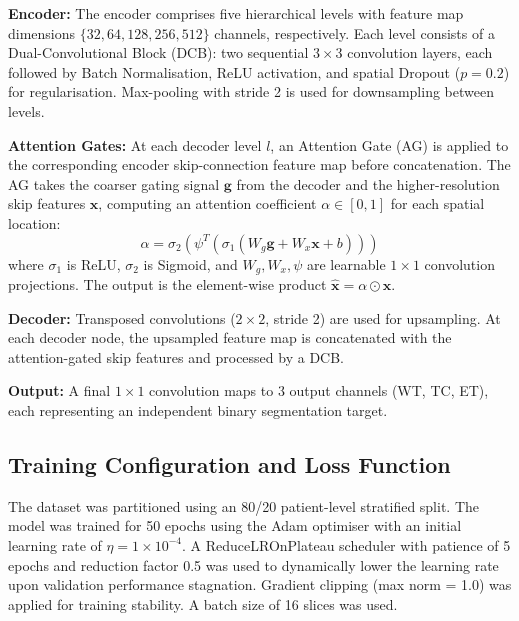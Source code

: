 \documentclass[conference]{IEEEtran}
\begin{document}
\textbf{Encoder:} The encoder comprises five hierarchical levels with feature map dimensions $\{32, 64, 128, 256, 512\}$ channels, respectively. Each level consists of a Dual-Convolutional Block (DCB): two sequential $3\times3$ convolution layers, each followed by Batch Normalisation, ReLU activation, and spatial Dropout ($p=0.2$) for regularisation. Max-pooling with stride 2 is used for downsampling between levels.

\textbf{Attention Gates:} At each decoder level $l$, an Attention Gate (AG) is applied to the corresponding encoder skip-connection feature map before concatenation. The AG takes the coarser gating signal $\mathbf{g}$ from the decoder and the higher-resolution skip features $\mathbf{x}$, computing an attention coefficient $\alpha \in [0,1]$ for each spatial location:
\begin{equation}
    \alpha = \sigma_2 \left( \psi^T \left( \sigma_1 \left( W_g \mathbf{g} + W_x \mathbf{x} + b \right) \right) \right)
\end{equation}
where $\sigma_1$ is ReLU, $\sigma_2$ is Sigmoid, and $W_g, W_x, \psi$ are learnable $1\times1$ convolution projections. The output is the element-wise product $\hat{\mathbf{x}} = \alpha \odot \mathbf{x}$.

\textbf{Decoder:} Transposed convolutions ($2\times2$, stride 2) are used for upsampling. At each decoder node, the upsampled feature map is concatenated with the attention-gated skip features and processed by a DCB.

\textbf{Output:} A final $1\times1$ convolution maps to 3 output channels (WT, TC, ET), each representing an independent binary segmentation target.

\subsection{Training Configuration and Loss Function}
The dataset was partitioned using an 80/20 patient-level stratified split. The model was trained for 50 epochs using the Adam optimiser with an initial learning rate of $\eta = 1 \times 10^{-4}$. A ReduceLROnPlateau scheduler with patience of 5 epochs and reduction factor 0.5 was used to dynamically lower the learning rate upon validation performance stagnation. Gradient clipping (max norm = 1.0) was applied for training stability. A batch size of 16 slices was used.
\end{document}
